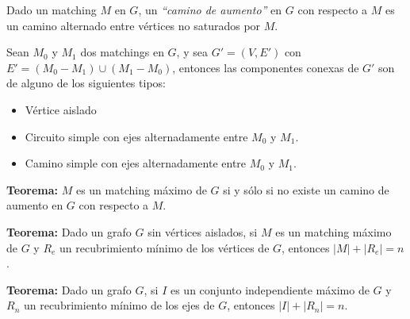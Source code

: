 Dado un matching $M$ en $G$, un \emph{``camino de aumento''} en $G$ con respecto a $M$ es un camino alternado entre v\'ertices no saturados por $M$.

Sean $M_0$ y $M_1$ dos matchings en $G$, y sea $G' = (V, E')$ con $E' = (M_0 - M_1) \cup (M_1 - M_0)$, entonces las componentes conexas de $G'$ son de alguno de los siguientes tipos:

\begin{itemize}
\item V\'ertice aislado
\item Circuito simple con ejes alternadamente entre $M_0$ y $M_1$.
\item Camino simple con ejes alternadamente entre $M_0$ y $M_1$.
\end{itemize}

\textbf{Teorema:} $M$ es un matching m\'aximo de $G$ si y s\'olo si no existe un camino de aumento en $G$ con respecto a $M$.

\textbf{Teorema:} Dado un grafo $G$ sin v\'ertices aislados, si $M$ es un matching m\'aximo de $G$ y $R_e$ un recubrimiento m\'inimo de los v\'ertices de $G$, entonces $|M| + |R_e| = n$.

\textbf{Teorema:} Dado un grafo $G$, si $I$ es un conjunto independiente m\'aximo de $G$ y $R_n$ un recubrimiento m\'inimo de los ejes de $G$, entonces $|I| + |R_n| = n$.
